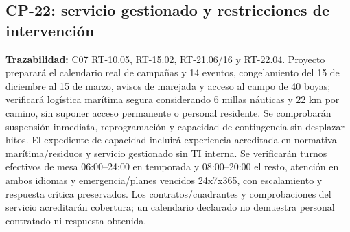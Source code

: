 \subsection{CP-22: servicio gestionado y restricciones de intervención}
\label{caso:cp-22}
\textbf{Trazabilidad:} C07 RT-10.05, RT-15.02, RT-21.06/16 y RT-22.04. Proyecto preparará el calendario real de campañas y 14 eventos, congelamiento del 15 de diciembre al 15 de marzo, avisos de marejada y acceso al campo de 40 boyas; verificará logística marítima segura considerando 6 millas náuticas y 22 km por camino, sin suponer acceso permanente o personal residente. Se comprobarán suspensión inmediata, reprogramación y capacidad de contingencia sin desplazar hitos. El expediente de capacidad incluirá experiencia acreditada en normativa marítima/residuos y servicio gestionado sin TI interna. Se verificarán turnos efectivos de mesa 06:00--24:00 en temporada y 08:00--20:00 el resto, atención en ambos idiomas y emergencia/planes vencidos 24x7x365, con escalamiento y respuesta crítica preservados. Los contratos/cuadrantes y comprobaciones del servicio acreditarán cobertura; un calendario declarado no demuestra personal contratado ni respuesta obtenida.
